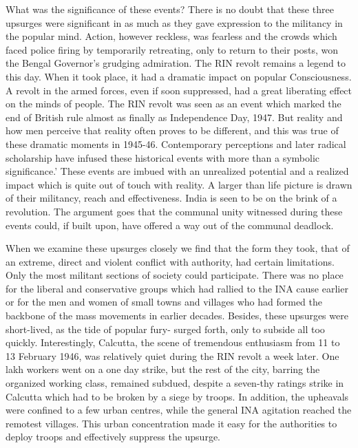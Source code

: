 What was the significance of these events? There is no doubt that these three upsurges were significant in as much as they gave expression to the militancy in the popular mind. Action, however reckless, was fearless and the crowds which faced police firing by temporarily retreating, only to return to their posts, won the Bengal Governor's grudging admiration. The RIN revolt remains a legend to this day. When it took place, it had a dramatic impact on popular Consciousness. A revolt in the armed forces, even if soon suppressed, had a great liberating effect on the minds of people. The RIN revolt was seen as an event which marked the end of British rule almost as finally as Independence Day, 1947. But reality and how men perceive that reality often proves to be different, and this was true of these dramatic moments in 1945-46. Contemporary perceptions and later radical scholarship have infused these historical events with more than a symbolic significance.' These events are imbued with an unrealized potential and a realized impact which is quite out of touch with reality. A larger than life picture is drawn of their militancy, reach and effectiveness. India is seen to be on the brink of a revolution. The argument goes that the communal unity witnessed during these events could, if built upon, have offered a way out of the communal deadlock. 

When we examine these upsurges closely we find that the form they took, that of an extreme, direct and violent conflict with authority, had certain limitations. Only the most militant sections of society could participate. There was no place for the liberal and conservative groups which had rallied to the INA cause earlier or for the men and women of small towns and villages who had formed the backbone of the mass movements in earlier decades. Besides, these upsurges were short-lived, as the tide of popular fury- surged forth, only to subside all too quickly. Interestingly, Calcutta, the scene of tremendous enthusiasm from 11 to 13 February 1946, was relatively quiet during the RIN revolt a week later. One lakh workers went on a one day strike, but the rest of the city, barring the organized working class, remained subdued, despite a seven-thy ratings strike in Calcutta which had to be broken by a siege by troops. In addition, the upheavals were confined to a few urban centres, while the general INA agitation reached the remotest villages. This urban concentration made it easy for the authorities to deploy troops and effectively suppress the upsurge. 

